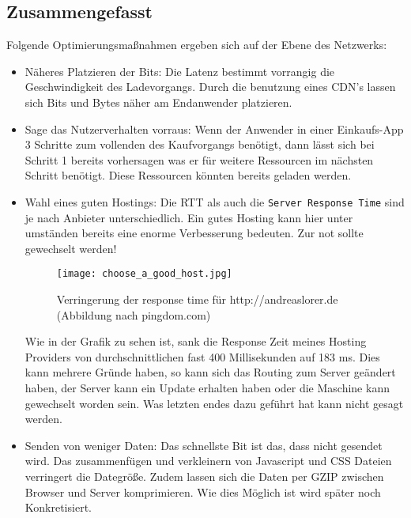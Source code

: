 
	\subsection{Zusammengefasst} %
	\label{sub:zusammengefasst}
		Folgende Optimierungsmaßnahmen ergeben sich auf der Ebene des Netzwerks:
		\begin{itemize}
			\item Näheres Platzieren der Bits: Die Latenz bestimmt vorrangig die Geschwindigkeit des Ladevorgangs. Durch die benutzung eines CDN's lassen sich Bits und Bytes näher am Endanwender platzieren.
			\item Sage das Nutzerverhalten vorraus: Wenn der Anwender in einer Einkaufs-App 3 Schritte zum vollenden des Kaufvorgangs benötigt, dann lässt sich bei Schritt 1 bereits vorhersagen was er für weitere Ressourcen im nächsten Schritt benötigt. Diese Ressourcen könnten bereits geladen werden.
			\item Wahl eines guten Hostings: Die RTT als auch die \texttt{Server Response Time} sind je nach Anbieter unterschiedlich. Ein gutes Hosting kann hier unter umständen bereits eine enorme Verbesserung bedeuten. Zur not sollte gewechselt werden!

			\begin{figure}[htbp]
				\begin{center}
					\texttt{[image: choose\_a\_good\_host.jpg]}
					\caption{Verringerung der response time für http://andreaslorer.de (Abbildung nach pingdom.com)}
					\label{fig:choose_a_good_host}
				\end{center}
			\end{figure}
			
			Wie in der Grafik zu sehen ist, sank die Response Zeit meines Hosting Providers von durchschnittlichen fast 400 Millisekunden auf 183 ms. Dies kann mehrere Gründe haben, so kann sich das Routing zum Server geändert haben, der Server kann ein Update erhalten haben oder die Maschine kann gewechselt worden sein. Was letzten endes dazu geführt hat kann nicht gesagt werden.

			\item Senden von weniger Daten: Das schnellste Bit ist das, dass nicht gesendet wird. Das zusammenfügen und verkleinern von Javascript und CSS Dateien verringert die Dategröße. Zudem lassen sich die Daten per GZIP zwischen Browser und Server komprimieren. Wie dies Möglich ist wird später noch Konkretisiert.


\end{itemize}
